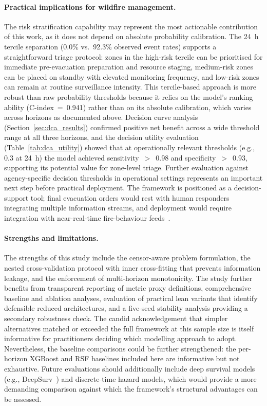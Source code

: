 \documentclass[fire,article,submit,pdftex]{../Definitions/mdpi}
\begin{document}
\paragraph{Practical implications for wildfire management.}
The risk stratification capability may represent the most actionable contribution of this work, as it does not depend on absolute probability calibration.
The 24~h tercile separation (0.0\% vs.\ 92.3\% observed event rates) supports a straightforward triage protocol: zones in the high-risk tercile can be prioritised for immediate pre-evacuation preparation and resource staging, medium-risk zones can be placed on standby with elevated monitoring frequency, and low-risk zones can remain at routine surveillance intensity.
This tercile-based approach is more robust than raw probability thresholds because it relies on the model's ranking ability (C-index~=~0.941) rather than on its absolute calibration, which varies across horizons as documented above.
Decision curve analysis (Section~\ref{sec:dca_results}) confirmed positive net benefit across a wide threshold range at all three horizons, and the decision utility evaluation (Table~\ref{tab:dca_utility}) showed that at operationally relevant thresholds (e.g., 0.3 at 24~h) the model achieved sensitivity~$>$~0.98 and specificity~$>$~0.93, supporting its potential value for zone-level triage.
Further evaluation against agency-specific decision thresholds in operational settings represents an important next step before practical deployment.
The framework is positioned as a decision-support tool; final evacuation orders would rest with human responders integrating multiple information streams, and deployment would require integration with near-real-time fire-behaviour feeds~\cite{Radeloff2023}.

\paragraph{Strengths and limitations.}
The strengths of this study include the censor-aware problem formulation, the nested cross-validation protocol with inner cross-fitting that prevents information leakage, and the enforcement of multi-horizon monotonicity.
The study further benefits from transparent reporting of metric proxy definitions, comprehensive baseline and ablation analyses, evaluation of practical lean variants that identify defensible reduced architectures, and a five-seed stability analysis providing a secondary robustness check.
The candid acknowledgement that simpler alternatives matched or exceeded the full framework at this sample size is itself informative for practitioners deciding which modelling approach to adopt.
Nevertheless, the baseline comparisons could be further strengthened: the per-horizon XGBoost and RSF baselines included here are informative but not exhaustive.
Future evaluations should additionally include deep survival models (e.g., DeepSurv~\cite{Katzman2018}) and discrete-time hazard models, which would provide a more demanding comparison against which the framework's structural advantages can be assessed.
\end{document}
